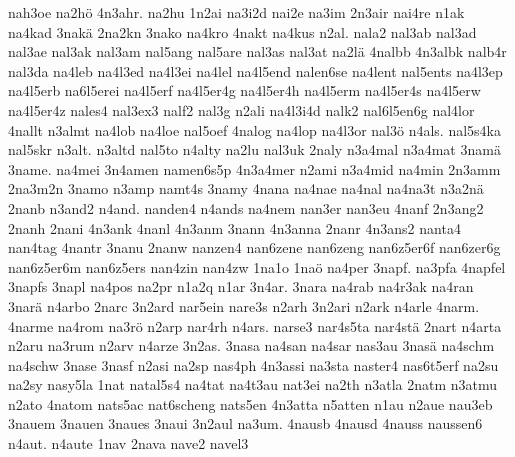{    nah3oe
    na2hö
    4n3ahr.
    na2hu
    1n2ai
    na3i2d
    nai2e
    na3im
    2n3air
    nai4re
    n1ak
    na4kad
    3nakä
    2na2kn
    3nako
    na4kro
    4nakt
    na4kus
    n2al.
    nala2
    nal3ab
    nal3ad
    nal3ae
    nal3ak
    nal3am
    nal5ang
    nal5are
    nal3as
    nal3at
    na2lä
    4nalbb
    4n3albk
    nalb4r
    nal3da
    na4leb
    na4l3ed
    na4l3ei
    na4lel
    na4l5end
    nalen6se
    na4lent
    nal5ents
    na4l3ep
    na4l5erb
    na6l5erei
    na4l5erf
    na4l5er4g
    na4l5er4h
    na4l5erm
    na4l5er4s
    na4l5erw
    na4l5er4z
    nales4
    nal3ex3
    nalf2
    nal3g
    n2ali
    na4l3i4d
    nalk2
    nal6l5en6g
    nal4lor
    4nallt
    n3almt
    na4lob
    na4loe
    nal5oef
    4nalog
    na4lop
    na4l3or
    nal3ö
    n4als.
    nal5s4ka
    nal5skr
    n3alt.
    n3altd
    nal5to
    n4alty
    na2lu
    nal3uk
    2naly
    n3a4mal
    n3a4mat
    3namä
    3name.
    na4mei
    3n4amen
    namen6s5p
    4n3a4mer
    n2ami
    n3a4mid
    na4min
    2n3amm
    2na3m2n
    3namo
    n3amp
    namt4s
    3namy
    4nana
    na4nae
    na4nal
    na4na3t
    n3a2nä
    2nanb
    n3and2
    n4and.
    nanden4
    n4ands
    na4nem
    nan3er
    nan3eu
    4nanf
    2n3ang2
    2nanh
    2nani
    4n3ank
    4nanl
    4n3anm
    3nann
    4n3anna
    2nanr
    4n3ans2
    nanta4
    nan4tag
    4nantr
    3nanu
    2nanw
    nanzen4
    nan6zene
    nan6zeng
    nan6z5er6f
    nan6zer6g
    nan6z5er6m
    nan6z5ers
    nan4zin
    nan4zw
    1na1o
    1naö
    na4per
    3napf.
    na3pfa
    4napfel
    3napfs
    3napl
    na4pos
    na2pr
    n1a2q
    n1ar
    3n4ar.
    3nara
    na4rab
    na4r3ak
    na4ran
    3narä
    n4arbo
    2narc
    3n2ard
    nar5ein
    nare3s
    n2arh
    3n2ari
    n2ark
    n4arle
    4narm.
    4narme
    na4rom
    na3rö
    n2arp
    nar4rh
    n4ars.
    narse3
    nar4s5ta
    nar4stä
    2nart
    n4arta
    n2aru
    na3rum
    n2arv
    n4arze
    3n2as.
    3nasa
    na4san
    na4sar
    nas3au
    3nasä
    na4schm
    na4schw
    3nase
    3nasf
    n2asi
    na2sp
    nas4ph
    4n3assi
    na3sta
    naster4
    nas6t5erf
    na2su
    na2sy
    nasy5la
    1nat
    natal5s4
    na4tat
    na4t3au
    nat3ei
    na2th
    n3atla
    2natm
    n3atmu
    n2ato
    4natom
    nats5ac
    nat6scheng
    nats5en
    4n3atta
    n5atten
    n1au
    n2aue
    nau3eb
    3nauem
    3nauen
    3naues
    3naui
    3n2aul
    na3um.
    4nausb
    4nausd
    4nauss
    naussen6
    n4aut.
    n4aute
    1nav
    2nava
    nave2
    navel3
}
